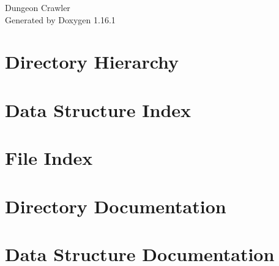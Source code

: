 \documentclass[twoside]{book}
\newcommand{\+}{\discretionary{\mbox{\scriptsize$\hookleftarrow$}}{}{}}
\newcommand{\clearemptydoublepage}{%
    \newpage{\pagestyle{empty}\cleardoublepage}%
  }
\begin{document}
  \raggedbottom
    \hypersetup{pageanchor=false,
                bookmarksnumbered=true,
                pdfencoding=unicode
               }
  \begin{titlepage}
  \vspace*{7cm}
  \begin{center}%
  {\Large Dungeon Crawler}\\
  \vspace*{1cm}
  {\large Generated by Doxygen 1.16.1}\\
  \end{center}
  \end{titlepage}
  \clearemptydoublepage
  \tableofcontents
  \clearemptydoublepage
  \hypersetup{pageanchor=true}

\chapter{Directory Hierarchy}

\chapter{Data Structure Index}

\chapter{File Index}

\chapter{Directory Documentation}











\chapter{Data Structure Documentation}








\end{document}
